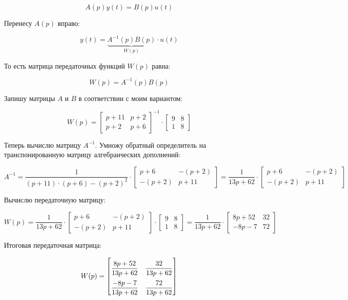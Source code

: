 \documentclass[a4paper,12pt]{article}
\begin{document}
	\[A(p) y(t) = B(p) u(t)\]
	
	Перенесу \(A(p)\) вправо:
	
	\[
	y(t) = \underbrace{ A^{-1}(p) B(p)}_{\textstyle W(p)} \cdot u(t)
	\]
	
	То есть матрица передаточных функций \(W(p)\) равна:
	
	\[W(p) = A^{-1}(p) B(p)\]
	
	Запишу матрицы \(A\) и \(B\) в соответствии с моим вариантом:
	
	
	\[
	W(p) = 
	\begin{bmatrix}
		p + 11 & p+2 \\
		p + 2 & p + 6
	\end{bmatrix}^{-1}
	\cdot
	\begin{bmatrix}
		9 & 8\\
		1 & 8
	\end{bmatrix}
	\]
	
	Теперь вычислю матрицу \(A^{-1}\). Умножу обратный определитель на транспонированную матрицу алгебраических дополнений:
	
	\[
	A^{-1} = \frac{1}{(p+11) \cdot (p+6) - (p+2)^2} \cdot  
	\begin{bmatrix}
		p + 6 & -(p+2) \\
		-(p+2) & p + 11
	\end{bmatrix}
	= 
	\frac{1}{13p + 62} \cdot  
	\begin{bmatrix}
		p + 6 & -(p+2) \\
		-(p+2) & p + 11
	\end{bmatrix}
	\]
	
	Вычислю передаточную матрицу:
	
	\[
	W(p) = 
	\frac{1}{13p + 62} \cdot  
	\begin{bmatrix}
		p + 6 & -(p+2) \\
		-(p+2) & p + 11
	\end{bmatrix} \cdot  
	\begin{bmatrix}
		9 & 8\\
		1 & 8
	\end{bmatrix} = 
	\frac{1}{13p + 62} \cdot 
	\begin{bmatrix}
		8p+52 & 32\\
		-8p-7 & 72
	\end{bmatrix}
	\]
	
	Итоговая передаточная матрица:
	
	\[
	\renewcommand{\arraystretch}{2.3}
	W(p) =  
	\begin{bmatrix}
		\displaystyle \frac{8p+52}{13p + 62} & \displaystyle \frac{32}{13p + 62} \\
		\displaystyle \frac{-8p-7}{13p + 62} & \displaystyle \frac{72}{13p + 62}
	\end{bmatrix}
	\renewcommand{\arraystretch}{1}
	\]
	
\end{document}
